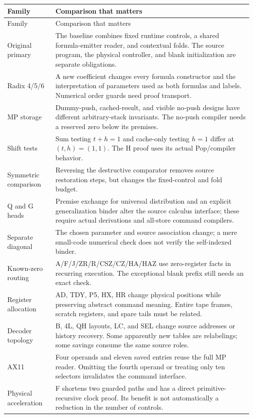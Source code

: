 \documentclass[11pt,letterpaper]{article}
\begin{document}
\begin{longtable}{@{}p{}p{}@{}}
\toprule Family & Comparison that matters\\\midrule\endfirsthead
\toprule Family & Comparison that matters\\\midrule\endhead
\bottomrule\endfoot
Original primary & The baseline combines fixed runtime controls, a shared formula-emitter reader, and contextual folds. The source program, the physical controller, and blank initialization are separate obligations.\\[4pt]
Radix 4/5/6 & A new coefficient changes every formula constructor and the interpretation of parameters used as both formulas and labels. Numerical order guards need proof transport.\\[4pt]
MP storage & Dummy-push, cached-result, and visible no-push designs have different arbitrary-stack invariants. The no-push compiler needs a reserved zero below its premises.\\[4pt]
Shift tests & Sum testing $t+h=1$ and cache-only testing $h=1$ differ at $(t,h)=(1,1)$. The H proof uses its actual Pop/compiler behavior.\\[4pt]
Symmetric comparison & Reversing the destructive comparator removes source restoration steps, but changes the fixed-control and fold budget.\\[4pt]
Q and G heads & Premise exchange for universal distribution and an explicit generalization binder alter the source calculus interface; these require actual derivations and all-store command compilers.\\[4pt]
Separate diagonal & The chosen parameter and source association change; a mere small-code numerical check does not verify the self-indexed binder.\\[4pt]
Known-zero routing & A/F/J/ZR/R/CSZ/CZ/HA/HAZ use zero-register facts in recurring execution. The exceptional blank prefix still needs an exact check.\\[4pt]
Register allocation & AD, TDY, P5, HX, HR change physical positions while preserving abstract command meaning. Entire tape frames, scratch registers, and spare tails must be related.\\[4pt]
Decoder topology & B, 4L, QH layouts, LC, and SEL change source addresses or history recovery. Some apparently new tables are relabelings; some savings consume the same source roles.\\[4pt]
AX11 & Four operands and eleven saved entries reuse the full MP reader. Omitting the fourth operand or treating only ten selectors invalidates the command interface.\\[4pt]
Physical acceleration & F shortens two guarded paths and has a direct primitive-recursive clock proof. Its benefit is not automatically a reduction in the number of controls.\\
\end{longtable}
\end{document}
